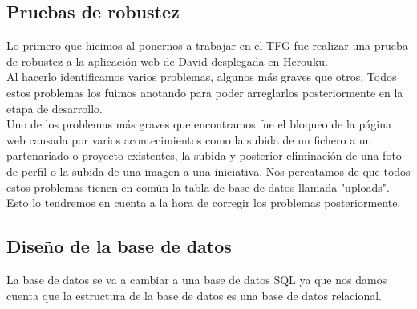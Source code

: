 \documentclass{article}
\begin{document}
\subsection{Pruebas de robustez}
Lo primero que hicimos al ponernos a trabajar en el TFG fue realizar una prueba de robustez a la aplicación web de David desplegada en Herouku.\\
Al hacerlo identificamos varios problemas, algunos más graves que otros. Todos estos problemas los fuimos anotando para poder arreglarlos posteriormente en la etapa de desarrollo.\\
Uno de los problemas más graves que encontramos fue el bloqueo de la página web causada por varios acontecimientos como la subida de un fichero a un partenariado o proyecto existentes, la subida y posterior eliminación de una foto de perfil o la subida de una imagen a una iniciativa. Nos percatamos de que todos estos problemas tienen en común la tabla de base de datos llamada "uploads". Esto lo tendremos en cuenta a la hora de corregir los problemas 
posteriormente.

\subsection{Diseño de la base de datos}
La base de datos se va a cambiar a una base de datos SQL ya que nos damos cuenta que la estructura de la base de datos es una base de datos relacional.


\end{document}
